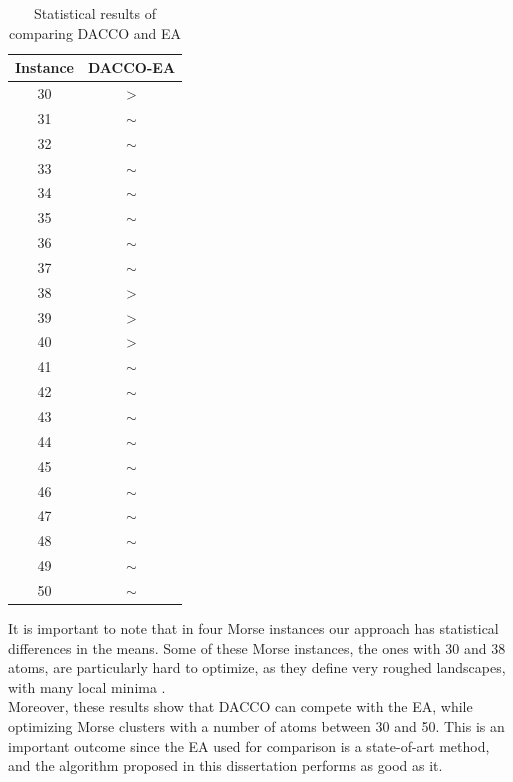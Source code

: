 			\begin{table}[!htdp]
					\begin{center}
						\begin{tabular}{| c | c |}
							\hline
							\textbf{Instance} & \textbf{DACCO-EA} \\ \hline
							30 & > \\ \hline
							31 & $\sim$ \\ \hline
							32 & $\sim$ \\ \hline
							33 & $\sim$ \\ \hline
							34 & $\sim$ \\ \hline
							35 & $\sim$ \\ \hline
							36 & $\sim$ \\ \hline
							37 & $\sim$ \\ \hline
							38 & > \\ \hline
							39 & > \\ \hline
							40 & > \\ \hline
							41 & $\sim$ \\ \hline
							42 & $\sim$ \\ \hline
							43 & $\sim$ \\ \hline
							44 & $\sim$ \\ \hline
							45 & $\sim$ \\ \hline
							46 & $\sim$ \\ \hline
							47 & $\sim$ \\ \hline
							48 & $\sim$ \\ \hline 
							49 & $\sim$ \\ \hline
							50 & $\sim$ \\ \hline
						\end{tabular}
						\caption{Statistical results of comparing DACCO and EA}
						\label{tab:statistical_comparison_ea}
					\end{center}
			\end{table}
		
		It is important to note that in four Morse instances our approach has statistical differences in the means. Some of these Morse instances,  the ones with 30 and 38 atoms, are particularly hard to optimize, as they define very roughed landscapes, with many local minima \cite{doye97}.\\
		
		Moreover, these results show that DACCO can compete with the EA, while optimizing Morse clusters with a number of atoms between 30 and 50. This is an important outcome since the EA used for comparison is a state-of-art method, and the algorithm proposed in this dissertation performs as good as it.



